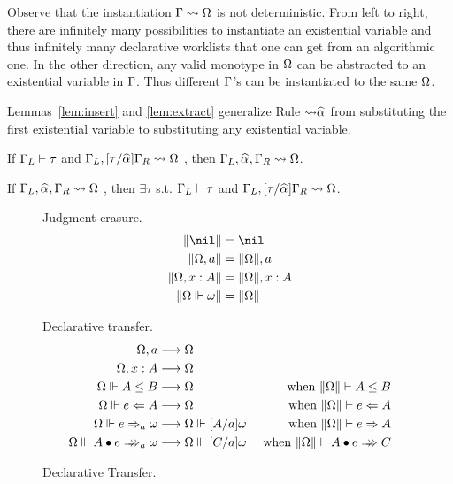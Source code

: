 Observe that the instantiation $\Gamma\rightsquigarrow\Omega$ is not deterministic.
From left to right, there are infinitely many possibilities to instantiate an existential variable and
thus infinitely many declarative worklists that one can get from an algorithmic one.
In the other direction, any valid monotype in $\Omega$ can be abstracted to an
existential variable in $\Gamma$. Thus different $\Gamma$'s can be instantiated to the same
$\Omega$.

Lemmas~\ref{lem:insert} and \ref{lem:extract}
generalize Rule $\mathtt{{\sto}\al}$ from substituting the first existential variable
to substituting any existential variable.

\begin{lemma}[Insert]\label{lem:insert}
If $\Gamma_L\vdash \tau$ and $\Gm_L, [\tau/\al]\Gm_R \sto \Om$
, then $\Gm_L, \al, \Gm_R \sto \Om$.
\end{lemma}
\begin{lemma}[Extract]\label{lem:extract}
If $\Gm_L, \al, \Gm_R \sto \Om$
, then $\exists \tau$ s.t. $\Gamma_L\vdash\tau$ and $\Gm_L, [\tau/\al]\Gm_R \sto \Om$.
\end{lemma}

\begin{figure}[t]
\hfill \framebox{$\|\Om\|$} \hfill Judgment erasure.
\begin{gather*}
\begin{aligned}
\|\nil\| &= \nil\\
\|\Om,a\| &= \|\Om\|, a\\
\|\Om,x:A\| &= \|\Om\|, x:A\\
\|\Om\Vdash\jg\| &= \|\Om\|
\end{aligned}
\end{gather*}

\hfill {} \hfill Declarative transfer.
\begin{gather*}
\begin{aligned}
\Om,a &\rto \Om \\  \Om,x:A & \rto \Om\\
\Om\Vdash A\le B &\rto \Om &\text{ when } \|\Om\| \vdash A\le B\\
\Om\Vdash e\Lto A &\rto \Om & \text{ when } \|\Om\| \vdash e\Lto A\\
\Om\Vdash e\To_a \jg &\rto \Om\Vdash[A/a]\jg & \text{ when } \|\Om\| \vdash e\To A\\
\Om\Vdash \appInfAlg{A}{e} &\rto \Om\Vdash[C/a]\jg & \text{ when } \|\Om\| \vdash \appInf{A}{e}{C}\\
\end{aligned}
\end{gather*}
\caption{Declarative Transfer.}
\label{fig:decl:worklist}
\end{figure}

